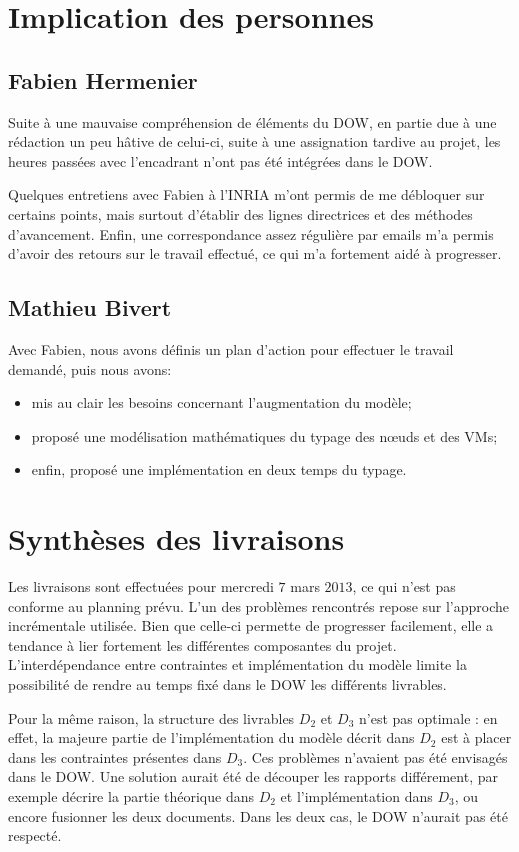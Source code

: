 \documentclass[a4paper]{article}
\begin{document}
\section{Implication des personnes}
\subsection{Fabien Hermenier}
Suite à une mauvaise compréhension de éléments du DOW, en partie due à
une rédaction un peu hâtive de celui-ci, suite à une assignation tardive
au projet, les heures passées avec l'encadrant n'ont pas été intégrées
dans le DOW.

Quelques entretiens avec Fabien à l'INRIA m'ont permis de me débloquer
sur certains points, mais surtout d'établir des lignes directrices et
des méthodes d'avancement. Enfin, une correspondance assez régulière
par emails m'a permis d'avoir des retours sur le travail effectué, ce
qui m'a fortement aidé à progresser.
\subsection{Mathieu Bivert}
Avec Fabien, nous avons définis un plan d'action pour effectuer le travail
demandé, puis nous avons:
\begin{itemize}
	\item mis au clair les besoins concernant l'augmentation du modèle;
	\item proposé une modélisation mathématiques du typage des nœuds et
		des VMs;
	\item enfin, proposé une implémentation en deux temps du typage.
\end{itemize}

\section{Synthèses des livraisons}
Les livraisons sont effectuées pour mercredi $7$ mars $2013$, ce qui n'est
pas conforme au planning prévu. L'un des problèmes rencontrés
repose sur l'approche incrémentale utilisée. Bien que celle-ci permette
de progresser facilement, elle a tendance à lier fortement les différentes
composantes du projet. L'interdépendance entre contraintes et implémentation
du modèle limite la possibilité de rendre au temps fixé dans le DOW les
différents livrables.

Pour la même raison, la structure des livrables $D_2$ et $D_3$ n'est pas
optimale : en effet, la majeure partie de l'implémentation du modèle décrit
dans $D_2$ est à placer dans les contraintes présentes dans $D_3$. Ces
problèmes n'avaient pas été envisagés dans le DOW. Une solution aurait été
de découper les rapports différement, par exemple décrire la partie théorique
dans $D_2$ et l'implémentation dans $D_3$, ou encore fusionner les deux
documents. Dans les deux cas, le DOW n'aurait pas été respecté.
\end{document}
